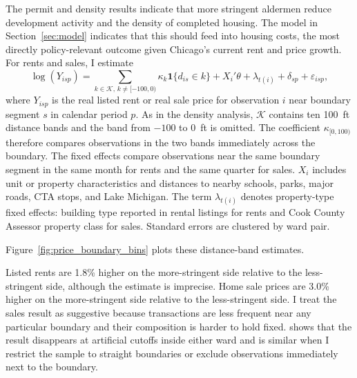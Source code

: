 The permit and density results indicate that more stringent aldermen reduce development activity and the density of completed housing.
The model in Section~\ref{sec:model} indicates that this should feed into housing costs, the most directly policy-relevant outcome given Chicago's current rent and price growth.
For rents and sales, I estimate
%
\begin{equation}
\label{eq:price_rd}
    \log(Y_{isp}) =
    \sum_{k \in \mathcal{K},\,k \neq [-100,0)}
    \kappa_k \mathbf{1}\{d_{is} \in k\}
    + X_i'\theta
    + \lambda_{t(i)}
    + \delta_{sp}
    + \varepsilon_{isp},
\end{equation}
%
where $Y_{isp}$ is the real listed rent or real sale price for observation $i$ near boundary segment $s$ in calendar period $p$.
As in the density analysis, $\mathcal{K}$ contains ten 100~ft distance bands and the band from $-100$ to 0~ft is omitted.
The coefficient $\kappa_{[0,100)}$ therefore compares observations in the two bands immediately across the boundary.
The fixed effects compare observations near the same boundary segment in the same month for rents and the same quarter for sales.
$X_i$ includes unit or property characteristics and distances to nearby schools, parks, major roads, CTA stops, and Lake Michigan.
The term $\lambda_{t(i)}$ denotes property-type fixed effects: building type reported in rental listings for rents and Cook County Assessor property class for sales.
Standard errors are clustered by ward pair.

Figure~\ref{fig:price_boundary_bins} plots these distance-band estimates.

Listed rents are 1.8\% higher on the more-stringent side relative to the less-stringent side, although the estimate is imprecise.
Home sale prices are 3.0\% higher on the more-stringent side relative to the less-stringent side.
I treat the sales result as suggestive because transactions are less frequent near any particular boundary and their composition is harder to hold fixed.
 shows that the result disappears at artificial cutoffs inside either ward and is similar when I restrict the sample to straight boundaries or exclude observations immediately next to the boundary.

